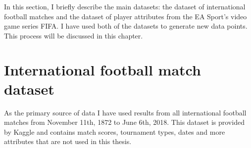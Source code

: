 In this section, I briefly describe the main datasets:  the dataset of international football matches and the dataset of player attributes from the EA Sport's video game series FIFA. I have used both of the datasets to generate new data points. This process will be discussed in this chapter.

\section{International football match dataset}
As the primary source of data I have used results from all international football matches from November 11th, 1872 to June 6th, 2018. This dataset is provided by Kaggle \cite{matchdb} and contains match scores, tournament types, dates and more attributes that are not used in this thesis.

